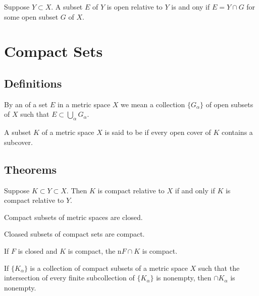 \begin{theorem}
	Suppose $Y \subset X$. A subset $E$ of $Y$ is open relative to $Y$ is and ony if $E = Y \cap G$ for some open subset $G$ of $X$.
\end{theorem}

\section{Compact Sets}
\subsection{Definitions}
\begin{definition}
	By an {} of a set $E$ in a metric space $X$ we mean a collection $\{G_\alpha\}$ of open subsets of $X$ such that $E \subset \bigcup_\alpha G_\alpha$.
\end{definition}

\begin{definition}
	A subset $K$ of a metric space $X$ is said to be {} if every open cover of $K$ contains a {} subcover. 
\end{definition}

\subsection{Theorems}
\begin{theorem}
	Suppose $K \subset Y \subset X$. Then $K$ is compact relative to $X$ if and only if $K$ is compact relative to $Y$. 
\end{theorem}

\begin{theorem}
	Compact subsets of metric spaces are closed.
\end{theorem}

\begin{theorem}
	Cloased subsets of compact sets are compact.
\end{theorem}

\begin{theorem}
	If $F$ is closed and $K$ is compact, the n$F \cap K$ is compact.
\end{theorem}

\begin{theorem}
	If $\{K_\alpha\}$ is a collection of compact subsets of a metric space $X$ such that the intersection of every finite subcollection of $\{K_\alpha\}$ is nonempty, then $\cap K_\alpha$ is nonempty.
\end{theorem}

